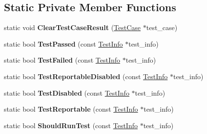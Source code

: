 \subsection*{Static Private Member Functions}
\begin{DoxyCompactItemize}
\item 
\mbox{\label{classtesting_1_1_test_case_a1c05fe33863b79b1b1ed19e665a1cea7}} 
static void {\bfseries Clear\+Test\+Case\+Result} (\hyperlink{classtesting_1_1_test_case}{Test\+Case} $\ast$test\+\_\+case)
\item 
\mbox{\label{classtesting_1_1_test_case_ad8d9e1ebc410000b679002ba71d78686}} 
static bool {\bfseries Test\+Passed} (const \hyperlink{classtesting_1_1_test_info}{Test\+Info} $\ast$test\+\_\+info)
\item 
\mbox{\label{classtesting_1_1_test_case_a5922884cb8b4819e869146dc315a1ac1}} 
static bool {\bfseries Test\+Failed} (const \hyperlink{classtesting_1_1_test_info}{Test\+Info} $\ast$test\+\_\+info)
\item 
\mbox{\label{classtesting_1_1_test_case_a1f2da5337f941d746dfcb98bc4acc149}} 
static bool {\bfseries Test\+Reportable\+Disabled} (const \hyperlink{classtesting_1_1_test_info}{Test\+Info} $\ast$test\+\_\+info)
\item 
\mbox{\label{classtesting_1_1_test_case_a2c6989cdeac01b2153f2e34dca1dbde6}} 
static bool {\bfseries Test\+Disabled} (const \hyperlink{classtesting_1_1_test_info}{Test\+Info} $\ast$test\+\_\+info)
\item 
\mbox{\label{classtesting_1_1_test_case_a2c3767df71e07939b32f19ef9c6ed271}} 
static bool {\bfseries Test\+Reportable} (const \hyperlink{classtesting_1_1_test_info}{Test\+Info} $\ast$test\+\_\+info)
\item 
\mbox{\label{classtesting_1_1_test_case_a75eb139557c43362f94916cfd6762c94}} 
static bool {\bfseries Should\+Run\+Test} (const \hyperlink{classtesting_1_1_test_info}{Test\+Info} $\ast$test\+\_\+info)
\end{DoxyCompactItemize}
